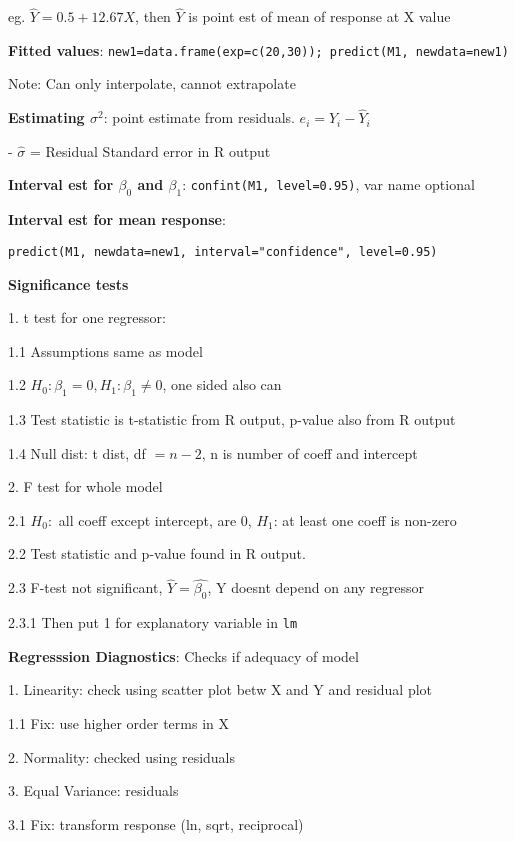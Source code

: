 \documentclass[10pt, a4paper]{article}
\newcommand{\red}[1]{{\color{red}#1}}
\newcommand{\tab}[0]{\hspace*{2mm}}
\begin{document}
\begin{multicols*}{3}
		eg. $\hat{Y} = 0.5 + 12.67X$, then $\hat{Y}$ is point est of mean of response at X value

		\textbf{Fitted values}: \texttt{new1=data.frame(exp=c(20,30)); predict(M1, newdata=new1)}

		\red{Note}: Can only interpolate, cannot extrapolate

		\textbf{Estimating $\sigma^2$}: point estimate from residuals. $e_i = Y_i - \hat{Y}_i$

		\tab{} - $\hat{\sigma}$ = Residual Standard error in R output

		\textbf{Interval est for $\beta_0$ and $\beta_1$}: \texttt{confint(M1, level=0.95)}, var name optional

		\textbf{Interval est for mean response}: 
		
		\texttt{predict(M1, newdata=new1, interval="confidence", level=0.95)}

		\textbf{Significance tests}

		1. t test for one regressor: 

		\tab{} 1.1 Assumptions same as model

		\tab{} 1.2 $H_0: \beta_1 = 0, H_1: \beta_1 \neq 0$, one sided also can

		\tab{} 1.3 Test statistic is t-statistic from R output, p-value also from R output

		\tab{} 1.4 Null dist: t dist, df $= n-2$, n is number of coeff and intercept

		2. F test for whole model

		\tab{} 2.1 $H_0:$ all coeff except intercept, are 0, $H_1$: at least one coeff is non-zero

		\tab{} 2.2 Test statistic and p-value found in R output. 

		\tab{} 2.3 F-test not significant, $\hat{Y} = \hat{\beta_0}$, Y doesnt depend on any regressor
		
		\tab{}\tab{} 2.3.1 Then put 1 for explanatory variable in \texttt{lm}

		\textbf{Regresssion Diagnostics}: Checks if adequacy of model

		1. Linearity: check using scatter plot betw X and Y and residual plot

		\tab{} 1.1 Fix: use higher order terms in X

		2. Normality: checked using residuals

		3. Equal Variance: residuals

		\tab{} 3.1 Fix: transform response (ln, sqrt, reciprocal)


\end{multicols*}
\end{document}
